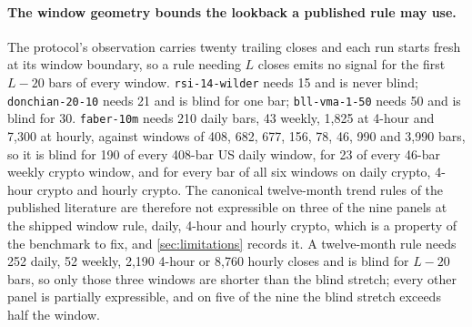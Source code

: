 \paragraph{The window geometry bounds the lookback a published rule may use.} The protocol's observation carries twenty trailing closes and each run starts fresh at its window boundary, so a rule needing $L$ closes emits no signal for the first $L-20$ bars of every window. \texttt{rsi-14-wilder} needs 15 and is never blind; \texttt{donchian-20-10} needs 21 and is blind for one bar; \texttt{bll-vma-1-50} needs 50 and is blind for 30. \texttt{faber-10m} needs 210 daily bars, 43 weekly, 1{,}825 at 4-hour and 7{,}300 at hourly, against windows of 408, 682, 677, 156, 78, 46, 990 and 3{,}990 bars, so it is blind for 190 of every 408-bar US daily window, for 23 of every 46-bar weekly crypto window, and for every bar of all six windows on daily crypto, 4-hour crypto and hourly crypto. The canonical twelve-month trend rules of the published literature are therefore not expressible on three of the nine panels at the shipped window rule, daily, 4-hour and hourly crypto, which is a property of the benchmark to fix, and \cref{sec:limitations} records it. A twelve-month rule needs 252 daily, 52 weekly, 2{,}190 4-hour or 8{,}760 hourly closes and is blind for $L-20$ bars, so only those three windows are shorter than the blind stretch; every other panel is partially expressible, and on five of the nine the blind stretch exceeds half the window.

